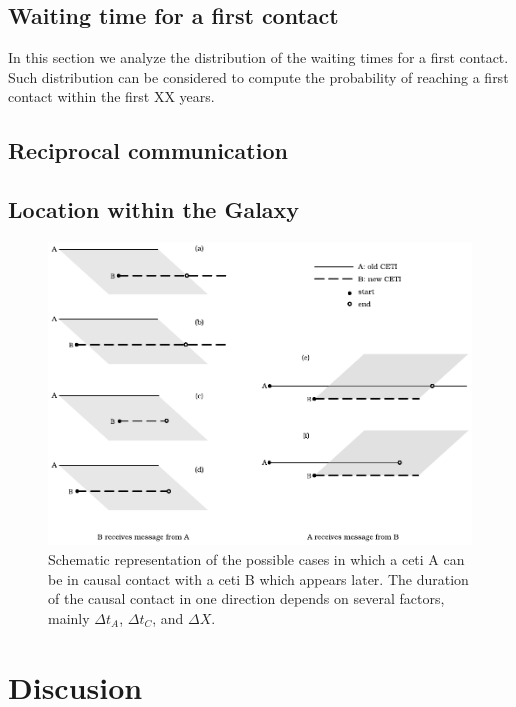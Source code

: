 \documentclass[useAMS,usenatbib]{mnras}
\begin{document}


\subsection{Waiting time for a first contact}

In this section we analyze the distribution of the waiting times for
a first contact.
%
Such distribution can be considered to compute the probability of
reaching a first contact within the first XX years.




\subsection{Reciprocal communication}



\subsection{Location within the Galaxy}



\begin{figure}
   \centering
   \includegraphics[width=\textwidth]{Messages_01.pdf}
   \caption{Schematic representation of the possible cases in which a
   ceti A can be in causal contact with a ceti B which appears later.
   The duration of the causal contact in one direction depends on
   several factors, mainly $\Delta t_A$, $\Delta t_C$, and $\Delta X$.}
   \label{F_messages}
\end{figure}
 

\section{Discusion}
\end{document}
